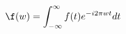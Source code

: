 \documentclass[preview]{standalone}
\begin{document}
\begin{align*}
\f(w) = \int_{-\infty}^{\infty} f(t)e^{-i2\pi wt}dt
\end{align*}
\end{document}
